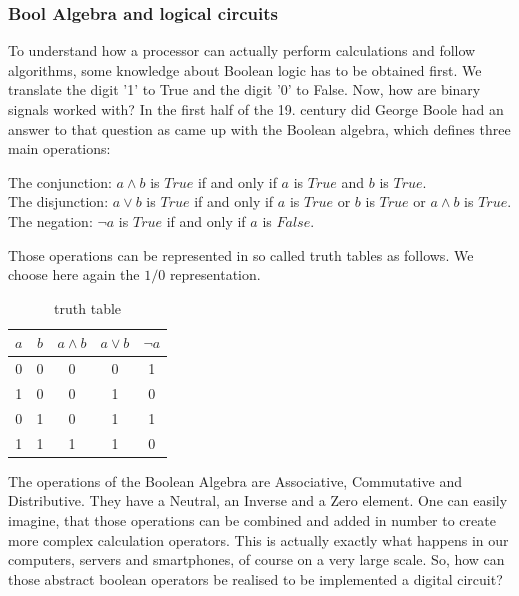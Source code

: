 \documentclass[11pt]{article}
\begin{document}
\subsubsection{Bool Algebra and logical circuits}
To understand how a processor can actually perform calculations and follow algorithms, some knowledge about Boolean logic has to be obtained first. We translate the digit '1' to True and the digit '0' to False. Now, how are binary signals worked with? In the first half of the 19. century did George Boole had an answer to that question as came up with the Boolean algebra, which defines three main operations: 

The conjunction: $a\land b$ is $True$ if and only if $a$ is $True$ and $b$ is $True$.\\
The disjunction: $a\lor b$  is $True$ if and only if $a$ is $True$ or $b$ is $True$ or $a\wedge b$ is $True$.\\
The negation:  $\neg a$ is $True$ if and only if $a$ is $False$. 

Those operations can be represented in so called truth tables as follows. We choose here again the $1 / 0$ representation.

\begin{table}[H]
\centering
\begin{tabular}{c|c|c|c|c}
\textbf{$a$} & \textbf{$b$} & \textbf{$a\land b$} & \textbf{$a\lor b$} & \textbf{$\neg a$} \\ \hline
0          & 0          & 0            & 0            & 1           \\
1          & 0          & 0            & 1            & 0           \\
0          & 1          & 0            & 1            & 1           \\
1          & 1          & 1            & 1            & 0          
\end{tabular}
\caption{truth table}
\label{tab:truth}
\end{table}

The operations of the Boolean Algebra are Associative, Commutative and Distributive. They have a Neutral, an Inverse and a Zero element. One can easily imagine, that those operations can be combined and added in number to create more complex calculation operators. This is actually exactly what happens in our computers, servers and smartphones, of course on a very large scale. 
So, how can those abstract boolean operators be realised to be implemented a digital circuit?
\end{document}
